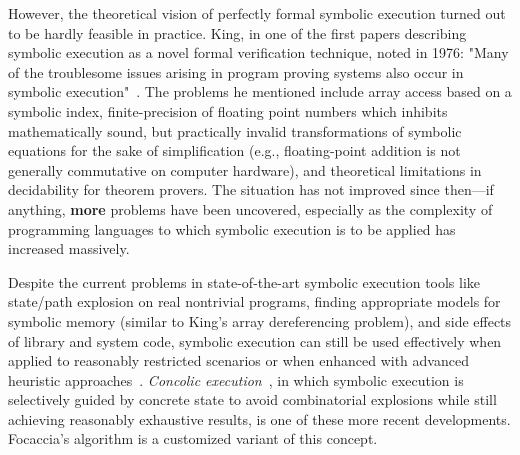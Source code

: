 However, the theoretical vision of perfectly formal symbolic execution turned out to be hardly feasible in practice.
King, in one of the first papers describing symbolic execution as a novel formal verification technique, noted in 1976:
"Many of the troublesome issues arising in program proving systems also occur in symbolic
execution"~\cite{King1976SymbExec}. The problems he mentioned include array access based on a symbolic index,
finite-precision of floating point numbers which inhibits mathematically sound, but practically invalid transformations
of symbolic equations for the sake of simplification (e.g., floating-point addition is not generally commutative on
computer hardware), and theoretical limitations in decidability for theorem provers. The situation has not improved
since then---if anything, \textbf{more} problems have been uncovered, especially as the complexity of programming
languages to which symbolic execution is to be applied has increased massively.

Despite the current problems in state-of-the-art symbolic execution tools like state/path explosion on real nontrivial
programs, finding appropriate models for symbolic memory (similar to King's array dereferencing problem), and side
effects of library and system code, symbolic execution can still be used effectively when applied to reasonably
restricted scenarios or when enhanced with advanced heuristic approaches~\cite{Baldoni2018SymbexecSurvey}.
\textit{Concolic execution}~\cite{Sen+2005Cute, Sen2007ConcolicTesting}, in which symbolic execution is selectively
guided by concrete state to avoid combinatorial explosions while still achieving reasonably exhaustive results, is one of
these more recent developments. Focaccia's algorithm is a customized variant of this concept.

%
%

